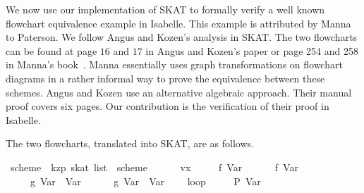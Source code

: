 \documentclass{llncs}
\begin{document}
We now use our implementation of SKAT to formally verify a well known
flowchart equivalence example in Isabelle. This example is attributed
by Manna to Paterson. We follow Angus and Kozen's analysis in
SKAT. The two flowcharts can be found at page $16$ and $17$ in Angus
and Kozen's paper or page 254 and 258 in Manna's
book~\cite{Manna}. Manna essentially uses graph transformations on
flowchart diagrams in a rather informal way to prove the equivalence
between these schemes. Angus and Kozen use an alternative algebraic
approach. Their manual proof covers six pages. Our contribution is the
verification of their proof in Isabelle.

The two flowcharts, translated into SKAT, are as follows.

\begin{isabellebody}
\isanewline
{}\isamarkupfalse%
\ scheme{}\ {}{}\ {}kzp\ skat\ list{}\ \ {}scheme{}\ {}\isanewline
\ \ {}\ {}\ {}{}\ vx\isanewline
\ \ {}\ {}\ {}{}\ f\ {}Var\ {}{}\isanewline
\ \ {}\ {}\ {}{}\ f\ {}Var\ {}{}\isanewline
\ \ {}\ {}\ {}{}\ g\ {}Var\ {}{}\ {}Var\ {}{}\isanewline
\ \ {}\ {}\ {}{}\ g\ {}Var\ {}{}\ {}Var\ {}{}\isanewline
\ \ {}\ loop\isanewline
\ \ \ \ {}\ {}{}P\ {}Var\ {}{}{}\isanewline

\end{isabellebody}
\end{document}
